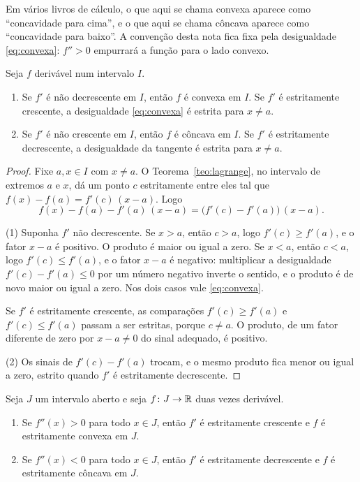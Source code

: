 \documentclass[11pt,a4paper]{article}
\begin{document}
\begin{observacao}
Em vários livros de cálculo, o que aqui se chama convexa aparece como ``concavidade para cima'', e o que aqui se chama côncava aparece como ``concavidade para baixo''. A convenção desta nota fica fixa pela desigualdade \eqref{eq:convexa}: $f''>0$ empurrará a função para o lado convexo.
\end{observacao}

\begin{proposicao}\label{prop:tangente}
Seja $f$ derivável num intervalo $I$.
\begin{enumerate}
\item Se $f'$ é não decrescente em $I$, então $f$ é convexa em $I$. Se $f'$ é estritamente crescente, a desigualdade \eqref{eq:convexa} é estrita para $x\neq a$.
\item Se $f'$ é não crescente em $I$, então $f$ é côncava em $I$. Se $f'$ é estritamente decrescente, a desigualdade da tangente é estrita para $x\neq a$.
\end{enumerate}
\end{proposicao}

\begin{proof}
Fixe $a,x\in I$ com $x\neq a$. O Teorema~\ref{teo:lagrange}, no intervalo de extremos $a$ e $x$, dá um ponto $c$ estritamente entre eles tal que $f(x)-f(a)=f'(c)\,(x-a)$. Logo
\[
f(x)-f(a)-f'(a)\,(x-a)=\bigl(f'(c)-f'(a)\bigr)\,(x-a).
\]

(1) Suponha $f'$ não decrescente. Se $x>a$, então $c>a$, logo $f'(c)\ge f'(a)$, e o fator $x-a$ é positivo. O produto é maior ou igual a zero. Se $x<a$, então $c<a$, logo $f'(c)\le f'(a)$, e o fator $x-a$ é negativo: multiplicar a desigualdade $f'(c)-f'(a)\le 0$ por um número negativo inverte o sentido, e o produto é de novo maior ou igual a zero. Nos dois casos vale \eqref{eq:convexa}.

Se $f'$ é estritamente crescente, as comparações $f'(c)\ge f'(a)$ e $f'(c)\le f'(a)$ passam a ser estritas, porque $c\neq a$. O produto, de um fator diferente de zero por $x-a\neq 0$ do sinal adequado, é positivo.

(2) Os sinais de $f'(c)-f'(a)$ trocam, e o mesmo produto fica menor ou igual a zero, estrito quando $f'$ é estritamente decrescente.
\end{proof}

\begin{corolario}\label{cor:segunda}
Seja $J$ um intervalo aberto e seja $f\colon J\to\mathbb{R}$ duas vezes derivável.
\begin{enumerate}
\item Se $f''(x)>0$ para todo $x\in J$, então $f'$ é estritamente crescente e $f$ é estritamente convexa em $J$.
\item Se $f''(x)<0$ para todo $x\in J$, então $f'$ é estritamente decrescente e $f$ é estritamente côncava em $J$.
\end{enumerate}
\end{corolario}
\end{document}

